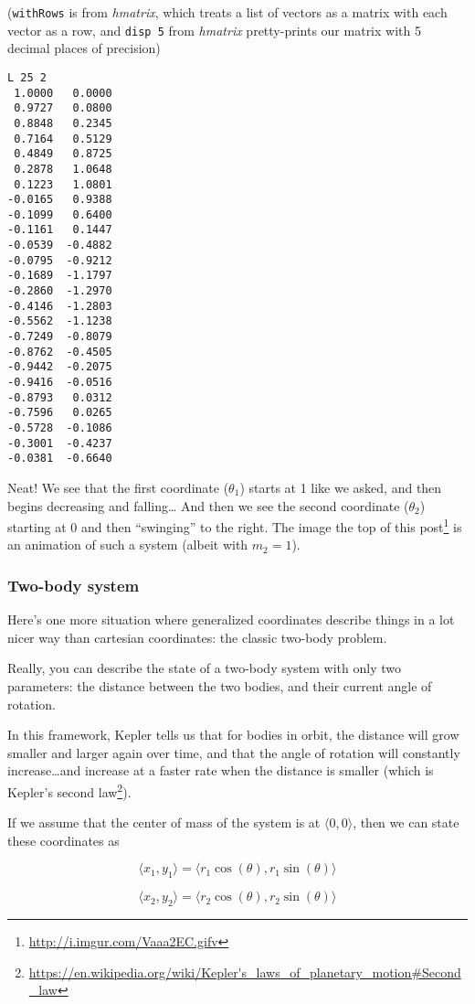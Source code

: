 \documentclass[]{article}
\renewcommand{\href}[2]{#2\footnote{\url{#1}}}
\begin{document}
(\texttt{withRows} is from \emph{hmatrix}, which treats a list of vectors as a
matrix with each vector as a row, and \texttt{disp\ 5} from \emph{hmatrix}
pretty-prints our matrix with 5 decimal places of precision)

\begin{verbatim}
L 25 2
 1.0000   0.0000
 0.9727   0.0800
 0.8848   0.2345
 0.7164   0.5129
 0.4849   0.8725
 0.2878   1.0648
 0.1223   1.0801
-0.0165   0.9388
-0.1099   0.6400
-0.1161   0.1447
-0.0539  -0.4882
-0.0795  -0.9212
-0.1689  -1.1797
-0.2860  -1.2970
-0.4146  -1.2803
-0.5562  -1.1238
-0.7249  -0.8079
-0.8762  -0.4505
-0.9442  -0.2075
-0.9416  -0.0516
-0.8793   0.0312
-0.7596   0.0265
-0.5728  -0.1086
-0.3001  -0.4237
-0.0381  -0.6640
\end{verbatim}

Neat! We see that the first coordinate (\(\theta_1\)) starts at 1 like we asked,
and then begins decreasing and falling\ldots{} And then we see the second
coordinate (\(\theta_2\)) starting at 0 and then ``swinging'' to the right. The
\href{http://i.imgur.com/Vaaa2EC.gifv}{image the top of this post} is an
animation of such a system (albeit with \(m_2 = 1\)).

\subsubsection{Two-body system}\label{two-body-system}

Here's one more situation where generalized coordinates describe things in a lot
nicer way than cartesian coordinates: the classic two-body problem.

Really, you can describe the state of a two-body system with only two
parameters: the distance between the two bodies, and their current angle of
rotation.

In this framework, Kepler tells us that for bodies in orbit, the distance will
grow smaller and larger again over time, and that the angle of rotation will
constantly increase\ldots{}and increase at a faster rate when the distance is
smaller (which is
\href{https://en.wikipedia.org/wiki/Kepler's_laws_of_planetary_motion\#Second_law}{Kepler's
second law}).

If we assume that the center of mass of the system is at
\(\langle 0, 0 \rangle\), then we can state these coordinates as

\[
\langle x_1, y_1 \rangle = \langle r_1 \cos (\theta), r_1 \sin (\theta) \rangle
\]

\[
\langle x_2, y_2 \rangle = \langle r_2 \cos (\theta), r_2 \sin (\theta) \rangle
\]
\end{document}
